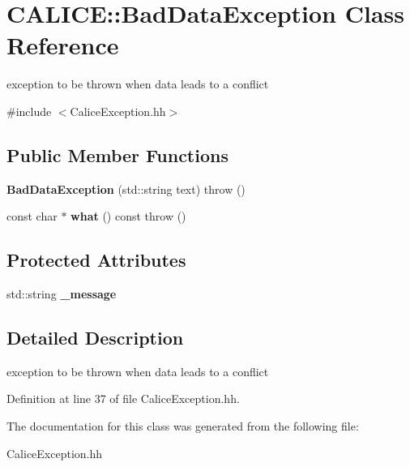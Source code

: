 \section{CALICE::BadDataException Class Reference}
\label{classCALICE_1_1BadDataException}


exception to be thrown when data leads to a conflict  


{\ttfamily \#include $<$CaliceException.hh$>$}\subsection*{Public Member Functions}
\begin{DoxyCompactItemize}
\item 
{\bfseries BadDataException} (std::string text)  throw ()\label{classCALICE_1_1BadDataException_a765bc2673e0be6a8371b058b3fbe4a4e}

\item 
const char $\ast$ {\bfseries what} () const   throw ()\label{classCALICE_1_1BadDataException_aee526e91ff2f998e8420baac9c070546}

\end{DoxyCompactItemize}
\subsection*{Protected Attributes}
\begin{DoxyCompactItemize}
\item 
std::string {\bfseries \_\-message}\label{classCALICE_1_1BadDataException_aca1e20b6d7f88c0cd5dbacb38b462386}

\end{DoxyCompactItemize}


\subsection{Detailed Description}
exception to be thrown when data leads to a conflict 

Definition at line 37 of file CaliceException.hh.

The documentation for this class was generated from the following file:\begin{DoxyCompactItemize}
\item 
CaliceException.hh\end{DoxyCompactItemize}
